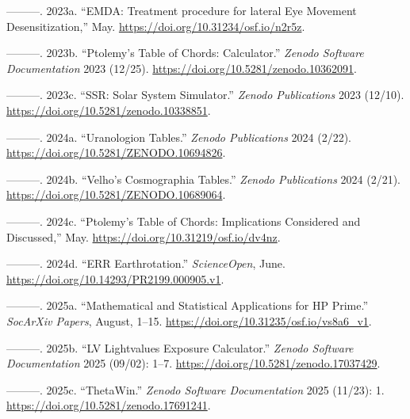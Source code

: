 \documentclass[
]{article}
\newlength{\cslhangindent}
\newlength{\cslentryspacingunit} %
\newenvironment{CSLReferences}[2] %
 {%
  \setlength{\parindent}{0pt}
  \ifodd #1
  \let\oldpar\par
  \def\par{\hangindent=\cslhangindent\oldpar}
  \fi
  \setlength{\parskip}{#2\cslentryspacingunit}
 }%
 {}
\begin{document}
\begin{CSLReferences}{1}{0}
\leavevmode{}%
---------. 2023a. {``{EMDA: Treatment procedure for lateral Eye Movement
Desensitization},''} May. \url{https://doi.org/10.31234/osf.io/n2r5z}.

\leavevmode{}%
---------. 2023b. {``Ptolemy's Table of Chords: Calculator.''}
\emph{Zenodo Software Documentation} 2023 (12/25).
\url{https://doi.org/10.5281/zenodo.10362091}.

\leavevmode{}%
---------. 2023c. {``SSR: Solar System Simulator.''} \emph{Zenodo
Publications} 2023 (12/10).
\url{https://doi.org/10.5281/zenodo.10338851}.

\leavevmode{}%
---------. 2024a. {``Uranologion Tables.''} \emph{Zenodo Publications}
2024 (2/22). \url{https://doi.org/10.5281/ZENODO.10694826}.

\leavevmode{}%
---------. 2024b. {``Velho's Cosmographia Tables.''} \emph{Zenodo
Publications} 2024 (2/21).
\url{https://doi.org/10.5281/ZENODO.10689064}.

\leavevmode{}%
---------. 2024c. {``Ptolemy's Table of Chords: Implications Considered
and Discussed,''} May. \url{https://doi.org/10.31219/osf.io/dv4nz}.

\leavevmode{}%
---------. 2024d. {``ERR Earthrotation.''} \emph{ScienceOpen}, June.
\url{https://doi.org/10.14293/PR2199.000905.v1}.

\leavevmode{}%
---------. 2025a. {``Mathematical and Statistical Applications for HP
Prime.''} \emph{SocArXiv Papers}, August, 1--15.
\url{https://doi.org/10.31235/osf.io/vs8a6_v1}.

\leavevmode{}%
---------. 2025b. {``LV Lightvalues Exposure Calculator.''} \emph{Zenodo
Software Documentation} 2025 (09/02): 1--7.
\url{https://doi.org/10.5281/zenodo.17037429}.

\leavevmode{}%
---------. 2025c. {``ThetaWin.''} \emph{Zenodo Software Documentation}
2025 (11/23): 1. \url{https://doi.org/10.5281/zenodo.17691241}.


\end{CSLReferences}
\end{document}
